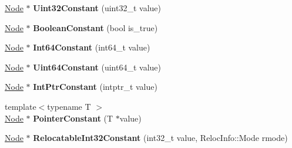 \begin{DoxyCompactItemize}
\item 
\hyperlink{classv8_1_1internal_1_1compiler_1_1_node}{Node} $\ast$ {\bfseries Uint32\+Constant} (uint32\+\_\+t value)\hypertarget{classv8_1_1internal_1_1compiler_1_1_j_s_graph_acfcb887828608ef80857617be9b2dbf0}{}\label{classv8_1_1internal_1_1compiler_1_1_j_s_graph_acfcb887828608ef80857617be9b2dbf0}

\item 
\hyperlink{classv8_1_1internal_1_1compiler_1_1_node}{Node} $\ast$ {\bfseries Boolean\+Constant} (bool is\+\_\+true)\hypertarget{classv8_1_1internal_1_1compiler_1_1_j_s_graph_a01619157654194382250bba40de125ff}{}\label{classv8_1_1internal_1_1compiler_1_1_j_s_graph_a01619157654194382250bba40de125ff}

\item 
\hyperlink{classv8_1_1internal_1_1compiler_1_1_node}{Node} $\ast$ {\bfseries Int64\+Constant} (int64\+\_\+t value)\hypertarget{classv8_1_1internal_1_1compiler_1_1_j_s_graph_a837b0a8208ce47b2166478101f9dc569}{}\label{classv8_1_1internal_1_1compiler_1_1_j_s_graph_a837b0a8208ce47b2166478101f9dc569}

\item 
\hyperlink{classv8_1_1internal_1_1compiler_1_1_node}{Node} $\ast$ {\bfseries Uint64\+Constant} (uint64\+\_\+t value)\hypertarget{classv8_1_1internal_1_1compiler_1_1_j_s_graph_a4ef22fe3fee72ff7b06ab3fc276bc326}{}\label{classv8_1_1internal_1_1compiler_1_1_j_s_graph_a4ef22fe3fee72ff7b06ab3fc276bc326}

\item 
\hyperlink{classv8_1_1internal_1_1compiler_1_1_node}{Node} $\ast$ {\bfseries Int\+Ptr\+Constant} (intptr\+\_\+t value)\hypertarget{classv8_1_1internal_1_1compiler_1_1_j_s_graph_a92412bea18d1ece433b69d0070caf401}{}\label{classv8_1_1internal_1_1compiler_1_1_j_s_graph_a92412bea18d1ece433b69d0070caf401}

\item 
{\footnotesize template$<$typename T $>$ }\\\hyperlink{classv8_1_1internal_1_1compiler_1_1_node}{Node} $\ast$ {\bfseries Pointer\+Constant} (T $\ast$value)\hypertarget{classv8_1_1internal_1_1compiler_1_1_j_s_graph_adcc2dbea83b81d546a252b1e240dea1e}{}\label{classv8_1_1internal_1_1compiler_1_1_j_s_graph_adcc2dbea83b81d546a252b1e240dea1e}

\item 
\hyperlink{classv8_1_1internal_1_1compiler_1_1_node}{Node} $\ast$ {\bfseries Relocatable\+Int32\+Constant} (int32\+\_\+t value, Reloc\+Info\+::\+Mode rmode)\hypertarget{classv8_1_1internal_1_1compiler_1_1_j_s_graph_ab9cb1a87341f6093934f7fed16bee584}{}\label{classv8_1_1internal_1_1compiler_1_1_j_s_graph_ab9cb1a87341f6093934f7fed16bee584}


\end{DoxyCompactItemize}

